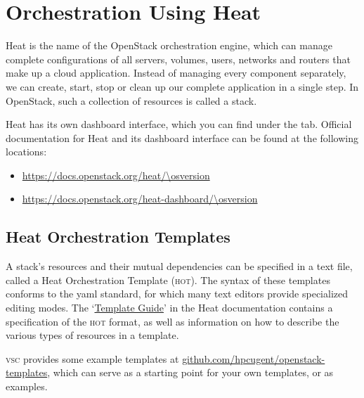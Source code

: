 \chapter{Orchestration Using Heat}\label{cha:orch-using-heat}
\gls{Heat} is the name of the OpenStack orchestration engine, which
can manage complete configurations of all servers, volumes, users,
networks and routers that make up a cloud application.  Instead of
managing every component separately, we can create, start, stop or
clean up our complete application in a single step.  In OpenStack,
such a collection of resources is called a \gls{stack}.

\gls{Heat} has its own dashboard interface, which you can find under
the  tab.  Official documentation for Heat and
its dashboard interface can be found at the following locations:
\begin{itemize}
\item \url{https://docs.openstack.org/heat/\osversion}
\item \url{https://docs.openstack.org/heat-dashboard/\osversion}
\end{itemize}

\section{\gls{Heat Orchestration Template}s}\label{sec:glsh-orch-templ}
A \gls{stack}'s resources and their mutual dependencies can be
specified in a text file, called a \gls{Heat Orchestration Template}
(\textsc{hot}).  The syntax of these templates conforms to the
\gls{yaml} standard, for which many text editors provide specialized
editing modes.  The
`\href{https://docs.openstack.org/heat/\osversion/template_guide}{Template
  Guide}' in the Heat documentation contains a specification of the
\textsc{hot} format, as well as information on how to describe the
various types of resources in a template.

\textsc{vsc} provides some example templates at
\href{https://github.com/hpcugent/openstack-templates}{github.com/hpcugent/openstack-templates},
which can serve as a starting point for your own templates, or as
examples.

